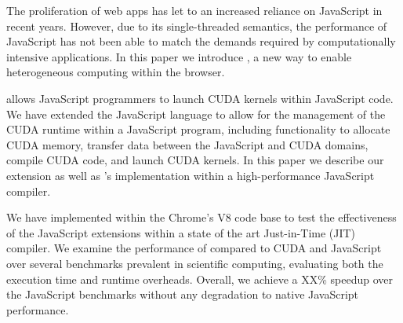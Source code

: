 
The proliferation of web apps has let to an increased reliance on JavaScript in
recent years. However, due to its single-threaded semantics, the performance of
JavaScript has not been able to match the demands required by computationally
intensive applications. In this paper we introduce \namens, a new way to enable
heterogeneous computing within the browser.

\name allows JavaScript programmers to launch CUDA kernels within JavaScript
code. We have extended the JavaScript language to allow for the management of
the CUDA runtime within a JavaScript program, including functionality to
allocate CUDA memory, transfer data between the JavaScript and CUDA domains,
compile CUDA code, and launch CUDA kernels. In this paper we describe our
extension as well as \namens's implementation within a high-performance
JavaScript compiler.

We have implemented \name within the Chrome's V8 code base to test the
effectiveness of the JavaScript extensions within a state of the art
Just-in-Time (JIT) compiler. We examine the performance of \name compared to
CUDA and JavaScript over several benchmarks prevalent in scientific computing,
evaluating both the execution time and runtime overheads.  Overall, we achieve a
XX\% speedup over the JavaScript benchmarks without any degradation to native
JavaScript performance.


